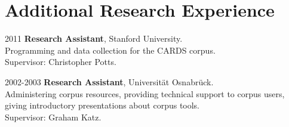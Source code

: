 \section*{Additional Research Experience}
\begin{dated}
	\item[2011]
		\textbf{Research Assistant}, Stanford University.\\
	    Programming and data collection for the CARDS corpus.\\
	    Supervisor: Christopher Potts.
	\item[2002-2003]
		\textbf{Research Assistant},  Universität Osnabrück.\\
	    Administering corpus resources, providing technical support to corpus 
	    users, giving introductory presentations about corpus tools.\\
	    Supervisor: Graham Katz.
\end{dated}